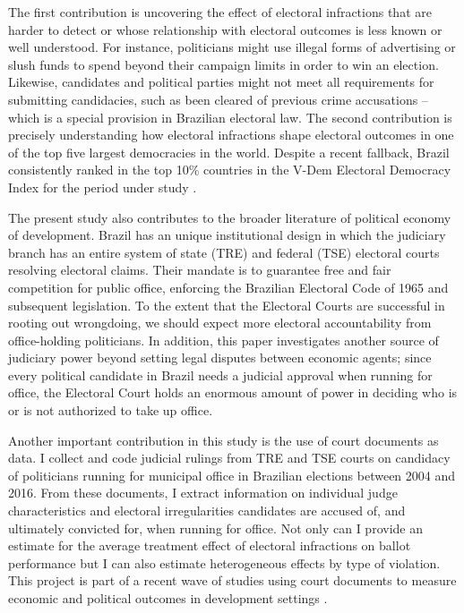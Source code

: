 \documentclass[11pt]{article}
\begin{document}
The first contribution is uncovering the effect of electoral infractions that are harder to detect or whose relationship with electoral outcomes is less known or well understood. For instance, politicians might use illegal forms of advertising or slush funds to spend beyond their campaign limits in order to win an election. Likewise, candidates and political parties might not meet all requirements for submitting candidacies, such as been cleared of previous crime accusations -- which is a special provision in Brazilian electoral law. The second contribution is precisely understanding how electoral infractions shape electoral outcomes in one of the top five largest democracies in the world. Despite a recent fallback, Brazil consistently ranked in the top 10\% countries in the V-Dem Electoral Democracy Index for the period under study \citep{CoppedgeVDemCountryYearDataset2018}.

The present study also contributes to the broader literature of political economy of development. Brazil has an unique institutional design in which the judiciary branch has an entire system of state (TRE) and federal (TSE) electoral courts resolving electoral claims. Their mandate is to guarantee free and fair competition for public office, enforcing the Brazilian Electoral Code of 1965 and subsequent legislation. To the extent that the Electoral Courts are successful in rooting out wrongdoing, we should expect more electoral accountability from office-holding politicians. In addition, this paper investigates another source of judiciary power beyond setting legal disputes between economic agents; since every political candidate in Brazil needs a judicial approval when running for office, the Electoral Court holds an enormous amount of power in deciding who is or is not authorized to take up office.

Another important contribution in this study is the use of court documents as data. I collect and code judicial rulings from TRE and TSE courts on candidacy of politicians running for municipal office in Brazilian elections between 2004 and 2016. From these documents, I extract information on individual judge characteristics and electoral irregularities candidates are accused of, and ultimately convicted for, when running for office. Not only can I provide an estimate for the average treatment effect of electoral infractions on ballot performance but I can also estimate heterogeneous effects by type of violation. This project is part of a recent wave of studies using court documents to measure economic and political outcomes in development settings \citep{Sanchez-MartinezDismantlingInstitutionsCourt2018,LambaisJudicialSubversionEvidence2018}.
\end{document}
